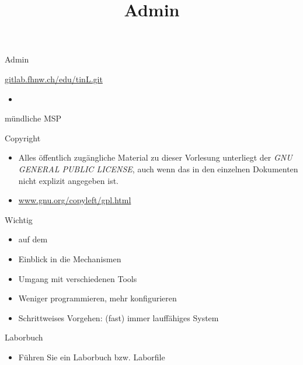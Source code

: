 \title[Admin]{Admin}
\frame{\titlepage}

\begin{frame}{Admin}
\begin{description}
 \item[git]{\tiny\url{gitlab.fhnw.ch/edu/tinL.git}}
 \begin{itemize}
  \item {}
 \end{itemize}
 \item[Prüfung] mündliche MSP
\end{description}
\end{frame}

\begin{frame}{Copyright}
 \begin{itemize}
  \item Alles öffentlich zugängliche Material zu dieser Vorlesung unterliegt
  der {\em GNU GENERAL PUBLIC LICENSE}, auch wenn das in den einzelnen
  Dokumenten nicht explizit angegeben ist. 
  \item
  \url{www.gnu.org/copyleft/gpl.html}
 \end{itemize}
\end{frame}

\begin{frame}{Wichtig}
 \begin{itemize}
  \item \linux auf dem \beaglebone
  \item Einblick in die Mechanismen
  \item Umgang mit verschiedenen Tools
  \item Weniger programmieren, mehr konfigurieren
  \item Schrittweises Vorgehen: (fast) immer lauffähiges System
 \end{itemize}
\end{frame}

\begin{frame}{Laborbuch}
 \begin{itemize}
  \item Führen Sie ein Laborbuch bzw. Laborfile
 \end{itemize}
\end{frame}

